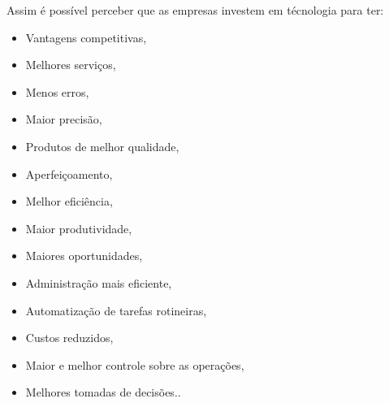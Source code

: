 \documentclass[
	12pt,				%
	openany,			%
	a4paper,			%
	chapter=TITLE,		%
	section=TITLE,		%
	english,
	brazil				%
]{abntex2}
\begin{document}
Assim é possível perceber que as empresas investem em técnologia para ter:
	\begin{itemize}
		\item Vantagens competitivas,
		\item Melhores serviços,
		\item Menos erros,
		\item Maior precisão, 
		\item Produtos de melhor qualidade,
		\item Aperfeiçoamento,
		\item Melhor eficiência,
		\item Maior produtividade, 
		\item Maiores oportunidades,
		\item Administração mais eficiente,
		\item Automatização de tarefas rotineiras,
		\item Custos reduzidos,
		\item Maior e melhor controle sobre as operações,
		\item Melhores tomadas de decisões..
	\end{itemize}
\end{document}
